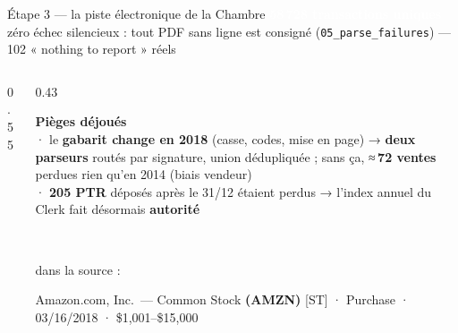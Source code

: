 \documentclass[11pt,aspectratio=169]{beamer}
\newcommand{\co}[1]{\texttt{#1}}
\newcommand{\badge}[2]{\colorbox{#1}{\textcolor{white}{\footnotesize\textbf{#2}}}}
\begin{document}
\begin{frame}{Étape 3 — la piste électronique de la Chambre}
  \badge{helec}{58\,728 transactions uniques}\quad
  {\footnotesize\color{black!60} zéro échec silencieux : tout PDF sans ligne est consigné
   (\co{05\_parse\_failures}) — 102 « nothing to report » réels}\\[3mm]
  \begin{columns}[T]
    \begin{column}{0.55\textwidth}
      \centering
    \end{column}
    \begin{column}{0.43\textwidth}
      \colorbox{alertred!10}{\parbox{0.96\linewidth}{\footnotesize
        \textcolor{alertred}{\textbf{Pièges déjoués}}\\[1mm]
        {\scriptsize
        · le \textbf{gabarit change en 2018} (casse, codes, mise en page) →
          \textbf{deux parseurs} routés par signature, union dédupliquée ;
          sans ça, ≈\,\textbf{72 ventes} perdues rien qu'en 2014 (biais vendeur)\\[1mm]
        · \textbf{205 PTR} déposés après le 31/12 étaient perdus →
          l'index annuel du Clerk fait désormais \textbf{autorité}}}}\\[3mm]
      {\scriptsize dans la source :\\
       \colorbox{black!6}{\parbox{0.94\linewidth}{\ttfamily\scriptsize
        Amazon.com, Inc.\ — Common Stock \textbf{(AMZN)} [ST] · Purchase ·
        03/16/2018 · \$1,001--\$15,000}}}
    \end{column}
  \end{columns}
\end{frame}
\end{document}
